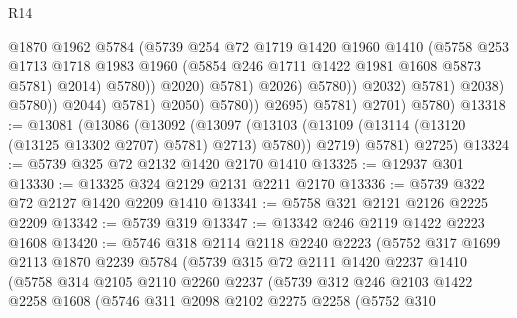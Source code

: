 \begin{lexlean}{R14}
\begin{coremodule}
                                            @1870
                                            @1962
                                            @5784
                                            (@5739
                                              @254
                                              @72
                                              @1719
                                              @1420
                                              @1960
                                              @1410
                                              (@5758
                                                @253
                                                @1713
                                                @1718
                                                @1983
                                                @1960
                                                (@5854 @246 @1711 @1422 @1981 @1608 @5873 @5781)
                                                @2014)
                                              @5780))
                                          @2020)
                                        @5781)
                                      @2026)
                                    @5780))
                                @2032)
                              @5781)
                            @2038)
                          @5780))
                      @2044)
                    @5781)
                  @2050)
                @5780))
            @2695)
          @5781)
        @2701)
      @5780)
@13318 := @13081
    (@13086
      (@13092
        (@13097 (@13103 (@13109 (@13114 (@13120 (@13125 @13302 @2707) @5781) @2713) @5780)) @2719)
        @5781)
      @2725)
@13324 := @5739 @325 @72 @2132 @1420 @2170 @1410
@13325 := @12937 @301
@13330 := @13325 @324 @2129 @2131 @2211 @2170
@13336 := @5739 @322 @72 @2127 @1420 @2209 @1410
@13341 := @5758 @321 @2121 @2126 @2225 @2209
@13342 := @5739 @319
@13347 := @13342 @246 @2119 @1422 @2223 @1608
@13420 := @5746
    @318
    @2114
    @2118
    @2240
    @2223
    (@5752
      @317
      @1699
      @2113
      @1870
      @2239
      @5784
      (@5739
        @315
        @72
        @2111
        @1420
        @2237
        @1410
        (@5758
          @314
          @2105
          @2110
          @2260
          @2237
          (@5739
            @312
            @246
            @2103
            @1422
            @2258
            @1608
            (@5746
              @311
              @2098
              @2102
              @2275
              @2258
              (@5752
                @310

\end{coremodule}
\end{lexlean}
